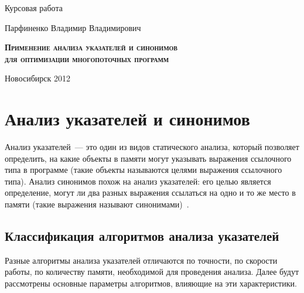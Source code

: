 \documentclass[14pt,titlepage,draft]{extarticle}
\begin{document}
\begin{center}
{      Курсовая работа

      \vspace{0.5cm}

      {\large Парфиненко Владимир Владимирович}

      \vspace{1.1cm}

      {\large \scshape \bfseries
        Применение анализа указателей и синонимов\\
        для оптимизации многопоточных программ
      }

      \vspace{2.5cm}


      \hfill{}

      \vfill

      Новосибирск 2012
    }
  \end{center}

  \listoftodos

  \tableofcontents

  \section{Анализ указателей и синонимов}

    Анализ указателей~--- это один из видов статического анализа, который
    позволяет определить, на какие объекты в памяти могут указывать выражения
    ссылочного типа в программе (такие объекты называются целями выражения
    ссылочного типа). Анализ синонимов похож на анализ указателей: его целью
    является определение, могут ли два разных выражения ссылаться на одно и
    то же место в памяти (такие выражения называют синонимами)~\cite{andersen}.

    \subsection{Классификация алгоритмов анализа указателей}
    \label{section:analysis_classification}

      Разные алгоритмы анализа указателей отличаются по точности, по скорости
      работы, по количеству памяти, необходимой для проведения анализа.
      Далее будут рассмотрены основные параметры алгоритмов, влияющие на эти
      характеристики.
\end{document}
